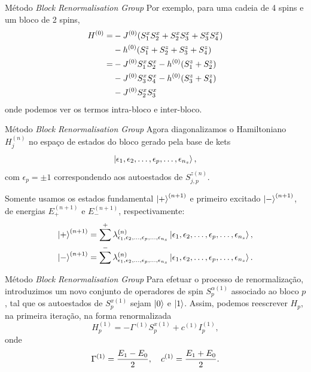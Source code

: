 \documentclass[brazil]{beamer}
\begin{document}
\begin{frame}{Método \textit{Block Renormalisation Group}}
    Por exemplo, para uma cadeia de 4 spins e um bloco de 2 spins,
    \begin{align}
        H^{(0)} = &- J^{(0)} \qty( S_1^x S_2^x + S_2^x S_3^x + S_3^x S_4^x ) \\
        &- h^{(0)} \qty( S_1^z + S_2^z + S_3^z + S_4^z ) \\
        = &- J^{(0)} S_1^x S_2^x - h^{(0)} ( S_1^z + S_2^z ) \\
        &- J^{(0)} S_3^x S_4^x - h^{(0)} ( S_3^z + S_4^z ) \\
        &- J^{(0)} S_2^x S_3^x
    \end{align}
    onde podemos ver os termos intra-bloco e inter-bloco.
\end{frame}

\begin{frame}{Método \textit{Block Renormalisation Group}}
    Agora diagonalizamos o Hamiltoniano \( H_j^{(n)} \) no espaço de estados do bloco gerado pela base de kets
    \begin{equation}
        \ket{\epsilon_1, \epsilon_2, \dotsc, \epsilon_p, \dotsc, \epsilon_{n_s}} ,
    \end{equation}
    com \( \epsilon_p = \pm 1 \) correspondendo aos autoestados de \( S_{j, p}^{z(n)} \).
    
    Somente usamos os estados fundamental \( \ket{+}^{(n + 1)} \) e primeiro excitado \( \ket{-}^{(n + 1)} \), de energias \( E_+^{(n + 1)} \) e \( E_-^{(n + 1)} \), respectivamente:
    \begin{gather}
        \ket{+}^{(n + 1)} = \sum^+ \lambda_{\epsilon_1, \epsilon_2, \dotsc, \epsilon_p, \dotsc, \epsilon_{n_s}}^{(n)} \ket{\epsilon_1, \epsilon_2, \dotsc, \epsilon_p, \dotsc, \epsilon_{n_s}} , \\
        \ket{-}^{(n + 1)} = \sum^- \lambda_{\epsilon_1, \epsilon_2, \dotsc, \epsilon_p, \dotsc, \epsilon_{n_s}}^{(n)} \ket{\epsilon_1, \epsilon_2, \dotsc, \epsilon_p, \dotsc, \epsilon_{n_s}}.
    \end{gather}
\end{frame}

\begin{frame}{Método \textit{Block Renormalisation Group}}
    Para efetuar o processo de renormalização, introduzimos um novo conjunto de operadores de spin \( S_p^{\alpha (1)} \) associado ao bloco \( p \), tal que os autoestados de \( S_p^{x (1)} \) sejam \( \ket{0} \) e \( \ket{1} \).
    Assim, podemos reescrever \( H_p \), na primeira iteração, na forma renormalizada
    \begin{equation}
        H_p^{(1)} = - \Gamma^{(1)} S_p^{x (1)} + c^{(1)} I_p^{(1)} ,
    \end{equation}
    onde
    \begin{equation}
        \Gamma^{(1)} = \frac{E_1 - E_0}{2} \qc c^{(1)} = \frac{E_1 + E_0}{2} .
    \end{equation}
\end{frame}
\end{document}
